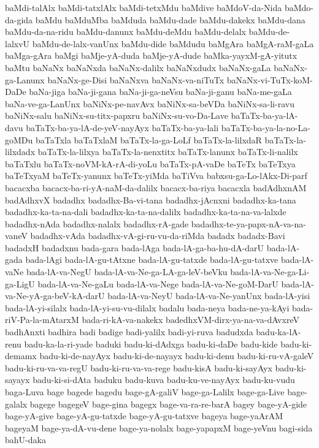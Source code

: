 {baMdi-talAlx
baMdi-tatxlAlx
baMdi-tetxMdu
baMdive
baMdoV-da-Nida
baMdo-da-gida
baMdu
baMduMba
baMduda
baMdu-dade
baMdu-dakekx
baMdu-dana
baMdu-da-na-ridu
baMdu-danunx
baMdu-deMdu
baMdu-delalx
baMdu-de-lalxvU
baMdu-de-lalx-vanUnx
baMdu-dide
baMdudu
baMgAra
baMgA-raM-gaLa
baMga-gAra
baMgi
baMje-yA-duda
baMje-yA-dude
baMka-yayxM-gA-yitutx
baMtu
baNaNx
baNaNxda
baNaNx-dalilx
baNaNxdudx
baNaNx-gaLa
baNaNx-ga-Lanunx
baNaNx-ge-Disi
baNaNxva
baNaNx-va-niTuTx
baNaNx-vi-TuTx-koM-DaDe
baNa-jiga
baNa-ji-gana
baNa-ji-ga-neVsu
baNa-ji-ganu
baNa-me-gaLa
baNa-ve-ga-LanUnx
baNiNx-pe-navAvx
baNiNx-sa-beVDa
baNiNx-sa-li-ravu
baNiNx-salu
baNiNx-su-titx-papxru
baNiNx-su-vo-Da-Lave
baTaTx-ba-ya-lA-davu
baTaTx-ba-ya-lA-de-yeV-nayAyx
baTaTx-ba-ya-lali
baTaTx-ba-ya-la-no-La-goMDu
baTaTxla
baTaTxlaM
baTaTx-la-ga-LoLf
baTaTx-la-lilxdaR
baTaTx-la-lilxdadx
baTaTx-la-lilxya
baTaTx-la-nenxtitx
baTaTx-lanunx
baTaTx-li-nalilx
baTaTxlu
baTaTx-noVM-kA-rA-di-yoLu
baTaTx-pA-vaDe
baTeTx
baTeTxya
baTeTxyaM
baTeTx-yanunx
baTeTx-yiMda
baTiVva
babxsu-ga-Lo-lAkx-Di-parf
bacacxba
bacacx-ba-ri-yA-naM-da-dalilx
bacacx-ba-riya
bacacxla
badAdhxnAM
badAdhxvX
badadhx
badadhx-Ba-vi-tana
badadhx-jAcnxni
badadhx-ka-tana
badadhx-ka-ta-na-dali
badadhx-ka-ta-na-dalilx
badadhx-ka-ta-na-va-lalxde
badadhx-nAda
badadhx-nalalx
badadhx-rA-gade
badadhx-te-ya-papx-nA-va-na-vaneV
badadhx-vAda
badadhx-vA-gi-ru-vu-da-riMda
badadx
badadx-Bavi
badadxH
badadxnu
bada-gara
bada-lAga
bada-lA-ga-ba-hu-dA-darU
bada-lA-gada
bada-lAgi
bada-lA-gu-tAtxne
bada-lA-gu-tatxde
bada-lA-gu-tatxve
bada-lA-vaNe
bada-lA-va-NegU
bada-lA-va-Ne-ga-LA-ga-leV-beVku
bada-lA-va-Ne-ga-Li-ga-LigU
bada-lA-va-Ne-gaLu
bada-lA-va-Nege
bada-lA-va-Ne-goM-DarU
bada-lA-va-Ne-yA-ga-beV-kA-darU
bada-lA-va-NeyU
bada-lA-va-Ne-yanUnx
bada-lA-yisi
bada-lA-yi-silalx
bada-lA-yi-su-vu-dilalx
badalu
bada-neya
bada-ne-ya-kAyi
bada-riV-Pa-la-mAtarxM
bada-ri-kA-va-nakekx
badedhxVM-dirx-ya-na-va-dAvxreV
badhAnxti
badhira
badi
badige
badi-yalilx
badi-yi-ruva
badudxda
badu-ka-lA-renu
badu-ka-la-ri-yade
baduki
badu-ki-dAdxga
badu-ki-daDe
badu-kide
badu-ki-demamx
badu-ki-de-nayAyx
badu-ki-de-nayayx
badu-ki-denu
badu-ki-ru-vA-galeV
badu-ki-ru-va-va-regU
badu-ki-ru-va-va-rege
badu-kisA
badu-ki-sayAyx
badu-ki-sayayx
badu-ki-si-dAta
baduku
badu-kuva
badu-ku-ve-nayAyx
badu-ku-vudu
baga-Luva
bage
bagede
bagedu
bage-gA-galiV
bage-ga-Lalilx
bage-ga-Live
bage-galalx
bagege
bagegeV
bage-gina
bagegx
bage-va-ra-re-barA
bagey
bage-yA-gide
bage-yA-give
bage-yA-gu-tatxde
bage-yA-gu-tatxve
bageya
bage-yaArAM
bageyaM
bage-ya-dA-vu-dene
bage-ya-nolalx
bage-yapapxM
bage-yeVnu
bagi-sida
bahU-daka
}
